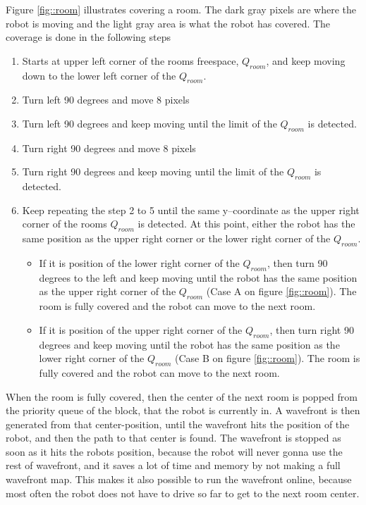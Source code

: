 Figure \ref{fig::room} illustrates covering a room. The dark gray pixels are where the robot is moving and the light gray area is what the robot has covered. The coverage is done in the following steps
\begin{enumerate}\itemsep-2pt
\item Starts at upper left corner of the rooms freespace, $Q_{room}$, and keep moving down to the lower left corner of the $Q_{room}$.
\item Turn left 90 degrees and move 8 pixels
\item Turn left 90 degrees and keep moving until the limit of the $Q_{room}$ is detected.
\item Turn right 90 degrees and move 8 pixels
\item Turn right 90 degrees and keep moving until the limit of the $Q_{room}$ is detected.
\item Keep repeating the step 2 to 5 until the same y--coordinate as the upper right corner of the rooms $Q_{room}$ is detected. At this point, either the robot has the same position as the upper right corner or the lower right corner of the $Q_{room}$.    
\begin{itemize}\itemsep-2pt  
\item If it is position of the lower right corner of the $Q_{room}$, then turn 90 degrees to the left and keep moving until the robot has the same position as the upper right corner of the $Q_{room}$ (Case A on figure \ref{fig::room}). The room is fully covered and the robot can move to the next room. 
\item If it is position of the upper right corner of the $Q_{room}$, then turn right 90 degrees and keep moving until the robot has the same position as the lower right corner of the $Q_{room}$ (Case B on figure \ref{fig::room}). The room is fully covered and the robot can move to the next room. 
\end{itemize}
\end{enumerate} 
When the room is fully covered, then the center of the next room is popped from the priority queue of the block, that the robot is currently in. A wavefront is then generated from that center-position, until the wavefront hits the position of the robot, and then the path to that center is found. The wavefront is stopped as soon as it hits the robots position, because the robot will never gonna use the rest of wavefront, and it saves a lot of time and memory by not making a full wavefront map. This makes it also possible to run the wavefront online, because most often the robot does not have to drive so far to get to the next room center. 

